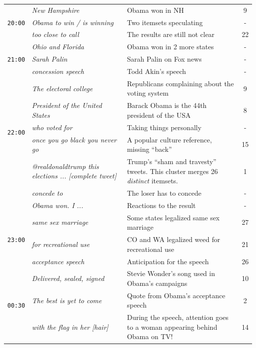 \documentclass{sig-alternate}
\begin{document}
\begin{table}
\begin{center}
\begin{tabular}{|p{0.7cm}|p{2.5cm}|p{4cm}|c|}
\multirow{3}{*}{\texttt{20:00}}
& \em New Hampshire &  Obama won in NH & 9 \\ \cline{2 - 4}
& \em Obama to win / is winning & Two itemsets speculating  & - \\ \cline{2-4}
& \em too close to call & The results are still not clear & 22 \\ \hline


\multirow{3}{*}{\texttt{21:00}}
& \em Ohio and Florida &  Obama won in 2 more states & - \\ \cline{2 - 4}
& \em Sarah Palin & Sarah Palin  on Fox news  & - \\ \cline{2-4} %
& \em concession speech & Todd Akin's  speech & - \\ \hline


\multirow{5}{*}{\texttt{22:00}} 
& \em The electoral college &  Republicans complaining about the voting system  & 9 \\ \cline{2 - 4}
& \em President of the United States & Barack Obama is the 44th president of the USA   & 8 \\ \cline{2-4} %
& \em who voted for & Taking things personally & - \\ \cline{2-4} %
& \em once you go black you never go & A popular culture reference, missing ``back''& 15 \\ 
 \hline %

\multirow{3}{*}{\texttt{22:30} }
& \em @realdonaldtrump this elections ... [complete tweet]	& Trump's ``sham and travesty'' tweets. This cluster merges 26 \emph{distinct} itemsets. & 1  \\ \cline{2-4}
& \em concede to & The loser has to concede  & - \\ \cline{2-4} %
& \em Obama won. I ... & Reactions to the result & - \\ \hline %

\multirow{3}{*}{\texttt{23:00} }
& \em same sex marriage	& Some states legalized same sex marriage & 27  \\ \cline{2-4}
& \em for recreational use & CO and WA legalized weed for recreational use   & 21 \\ \cline{2-4} %
& \em acceptance speech & Anticipation for the speech & 26 \\ \hline %

\multirow{3}{*}{\texttt{00:30} }
& \em Delivered, sealed, signed & Stevie Wonder's song used in Obama's campaigns & 10  \\ \cline{2-4}
& \em The best is yet to come & Quote from Obama's acceptance speech  & 2 \\ \cline{2-4} %
& \em with the flag in her [hair]	&  During the speech, attention goes to a woman appearing behind Obama on TV! & 14 \\ \hline %
						

\end{tabular}
\end{center}
\end{table}
\end{document}
